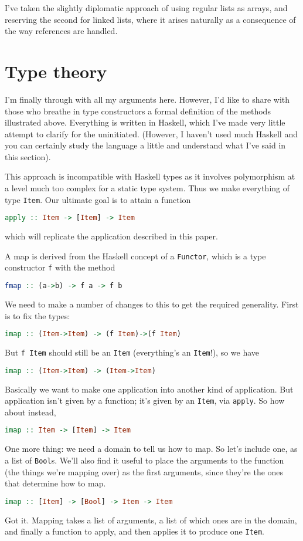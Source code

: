 \documentclass{article}
\newcommand{\code}[1]{\lstinline`#1`}
\begin{document}
I've taken the slightly diplomatic approach of using regular lists as arrays, and reserving the second for linked lists, where it arises naturally as a consequence of the way references are handled.

\section{Type theory}
\newcommand{\Item}{\code{Item}}
I'm finally through with all my arguments here. However, I'd like to share with those who breathe in type constructors a formal definition of the methods illustrated above. Everything is written in Haskell, which I've made very little attempt to clarify for the uninitiated. (However, I haven't used much Haskell and you can certainly study the language a little and understand what I've said in this section).

This approach is incompatible with Haskell types as it involves polymorphism at a level much too complex for a static type system. Thus we make everything of type \Item. Our ultimate goal is to attain a function
\begin{lstlisting}[language=Haskell]
apply :: Item -> [Item] -> Item
\end{lstlisting}
which will replicate the application described in this paper.

A map is derived from the Haskell concept of a \code{Functor}, which is a type constructor \code{f} with the method
\begin{lstlisting}[language=Haskell]
fmap :: (a->b) -> f a -> f b
\end{lstlisting}
We need to make a number of changes to this to get the required generality. First is to fix the types:
\begin{lstlisting}[language=Haskell]
imap :: (Item->Item) -> (f Item)->(f Item)
\end{lstlisting}
But \code{f Item} should still be an \Item{} (everything's an \Item!), so we have
\begin{lstlisting}[language=Haskell]
imap :: (Item->Item) -> (Item->Item)
\end{lstlisting}
Basically we want to make one application into another kind of application. But application isn't given by a function; it's given by an \Item, via \code{apply}. So how about instead,
\begin{lstlisting}[language=Haskell]
imap :: Item -> [Item] -> Item
\end{lstlisting}
One more thing: we need a domain to tell us how to map. So let's include one, as a list of \code{Bool}s. We'll also find it useful to place the arguments to the function (the things we're mapping over) as the first arguments, since they're the ones that determine how to map.
\begin{lstlisting}[language=Haskell]
imap :: [Item] -> [Bool] -> Item -> Item
\end{lstlisting}
Got it. Mapping takes a list of arguments, a list of which ones are in the domain, and finally a function to apply, and then applies it to produce one \Item.
\end{document}
